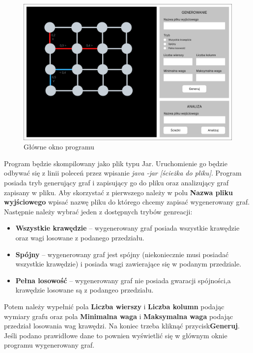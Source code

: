 \documentclass{article}
\begin{document}
\begin{figure}[htp]
        \centering
        \includegraphics[width=13cm]{images/gui_main.png}
        \caption{Główne okno programu}
        \label{fig:gui_main}
\end{figure}
Program będzie skompilowany jako plik typu Jar. Uruchomienie go będzie odbywać się z linii poleceń przez wpisanie \textit{java -jar [ścieżka do pliku]}.
Program posiada tryb generujący graf i zapisujący go do pliku oraz analizujący graf zapisany w pliku. Aby skorzystać z pierwszego należy w polu \textbf{Nazwa pliku wyjściowego} wpisać nazwę pliku do którego chcemy zapisać wygenerowany graf. Następnie należy wybrać jeden z dostępnych trybów genreacji:

\begin{itemize}
    \item \textbf{Wszystkie krawędzie} -- wygenerowany graf posiada wszystkie krawędzie oraz wagi losowane z podanego przedziału.
    \item \textbf{Spójny} -- wygenerowany graf jest spójny (niekoniecznie musi posiadać wszystkie krawędzie) i posiada wagi zawierające się w podanym przedziale.
    \item \textbf{Pełna losowość} -- wygenerowany graf nie posiada gwaracji spójności,\linebreak a krawędzie losowane są z podangeo przedziału. 
\end{itemize}

Potem należy wypełnić pola \textbf{Liczba wierszy} i \textbf{Liczba kolumn} podając wymiary grafu oraz pola \textbf{Minimalna waga} i \textbf{Maksymalna waga} podając przedział losowania wag krawędzi. Na koniec trzeba kliknąć przycisk\linebreak \textbf{Generuj}. Jeśli podano prawidłowe dane to pownien wyświetlić się w głównym oknie programu wygenerowany graf.
\end{document}
